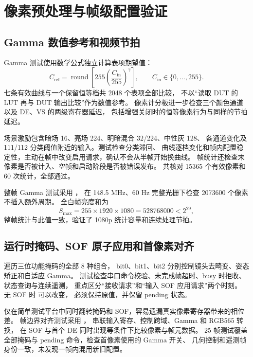 \section{像素预处理与帧级配置验证}
\subsection{Gamma 数值参考和视频节拍}
Gamma 测试使用数学公式独立计算表项期望值：
\begin{equation}
C_{\mathrm{ref}}=\operatorname{round}\!\left[255
\left(\frac{C_{\mathrm{in}}}{255}\right)^\gamma\right],
\qquad C_{\mathrm{in}}\in\{0,\ldots,255\}.
\end{equation}
七条有效曲线与一个保留恒等档共 2048 个表项全部比较，
不以“读取 DUT 的 LUT 再与 DUT 输出比较”作为数值参考。
像素计分板进一步检查三个颜色通道以及 DE、VS 的两级寄存器延迟，
包括增强关闭时的恒等像素行为与同样的节拍延迟。

场景激励包含暗场 16、亮场 224、明暗混合 32/224、中性灰 128、
各通道变化及 111/112 分类阈值附近的输入。测试检查分类滞回、
曲线逐档变化和帧内配置稳定性，主动在帧中改变启用请求，确认不会从半帧开始换曲线。
帧统计还检查末像素是否被计入、空帧和启动阶段是否被错误发布。
共核对 15365 个有效像素和 60 次统计，全部通过。

整帧 Gamma 测试采用 ，
在 148.5 MHz、60 Hz 完整光栅下检查 2073600 个像素不插入额外周期。
全白帧亮度和为
\begin{equation}
S_{\max}=255\times1920\times1080=528768000<2^{29},
\end{equation}
整帧统计与此值一致，验证了 1080p 统计容量和连续处理节拍。

\subsection{运行时掩码、SOF 原子应用和首像素对齐}
 遍历三位功能掩码的全部 8 种组合，
bit0、bit1、bit2 分别控制镜头去畸变、姿态矫正和自适应 Gamma。
测试检查串口命令校验、未完成帧超时、busy 时拒收、状态查询与连续遥测，
重点区分“接收请求”和“输入 SOF 应用请求”两个时刻。
无 SOF 时  可以改变，
 必须保持原值，并保留 pending 状态。

仅在简单测试平台中同时翻转掩码和 SOF，容易遗漏真实像素寄存器带来的相位差。
帧边界对齐测试采用 ，
串联输入寄存、控制跨域、Gamma 和 RGB565 转换，
在 SOF 与首个 DE 同时出现等条件下比较像素与帧元数据。
25 帧测试覆盖全部掩码与 pending 命令，检查首像素使用的 Gamma 开关、
几何控制和遥测帧身份一致，未发现一帧内混用新旧配置。

